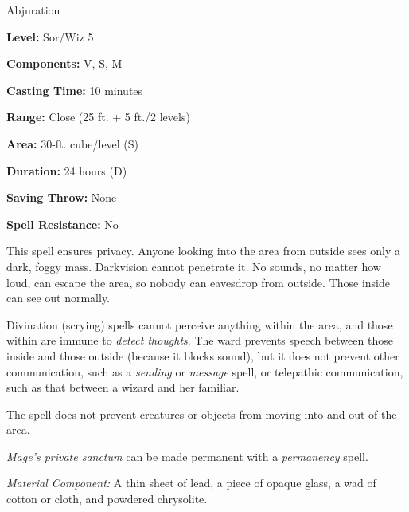 
Abjuration

\textbf{Level:} Sor/Wiz 5

\textbf{Components:} V, S, M

\textbf{Casting Time:} 10 minutes

\textbf{Range:} Close (25 ft. + 5 ft./2 levels)

\textbf{Area:} 30-ft. cube/level (S)

\textbf{Duration:} 24 hours (D)

\textbf{Saving Throw:} None

\textbf{Spell Resistance:} No

This spell ensures privacy. Anyone looking into the area from outside sees only 
a dark, foggy mass. Darkvision cannot penetrate it. No sounds, no matter how loud, 
can escape the area, so nobody can eavesdrop from outside. Those inside can see 
out normally.

Divination (scrying) spells cannot perceive anything within the area, and those 
within are immune to \textit{detect thoughts}. The ward prevents speech between 
those inside and those outside (because it blocks sound), but it does not prevent 
other communication, such as a \textit{sending} or \textit{message} spell, or telepathic 
communication, such as that between a wizard and her familiar.

The spell does not prevent creatures or objects from moving into and out of the 
area.

\textit{Mage's private sanctum} can be made permanent with a \textit{permanency 
}spell.

\textit{Material Component:} A thin sheet of lead, a piece of opaque glass, a wad 
of cotton or cloth, and powdered chrysolite.

